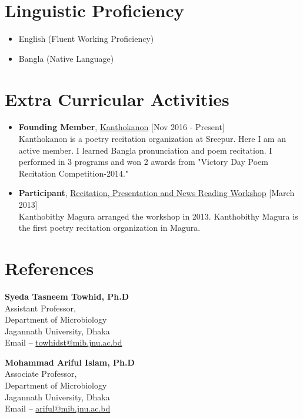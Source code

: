 \documentclass[11pt,a4paper]{moderncv}
\begin{document}
\section{Linguistic Proficiency}
\begin{itemize}  	
	\item English (Fluent Working Proficiency)
	\item Bangla (Native Language)
\end{itemize}



\section{Extra Curricular Activities}
\begin{itemize}
	\item \textbf{Founding Member}, 
	\textcolor{blue}{\href{}{Kanthokanon}}
	\hfill [Nov 2016 - Present]\\ 
	Kanthokanon is a poetry recitation organization at Sreepur. Here I am an 
	active member. I learned Bangla pronunciation and poem recitation. I 
	performed in 3 programs and won 2 awards from "Victory Day Poem Recitation 
	Competition-2014."
	
	\item \textbf{Participant}, 
	\textcolor{blue}{\href{}{Recitation, Presentation and News Reading 
	Workshop}}
	\hfill [March 2013]\\ 
	Kanthobithy Magura arranged the workshop in 2013. Kanthobithy Magura is the 
	first poetry recitation organization in Magura. 
	
	
\end{itemize}

\section{References}
\begin{multicols}{2}
\textbf{Syeda Tasneem Towhid, Ph.D}\\ 
Assistant Professor, \\ 
Department of Microbiology \\ 
Jagannath University, Dhaka \\ 
Email -- \textcolor{blue}{\url{towhidst@mib.jnu.ac.bd}} 

\columnbreak 
\textbf{Mohammad Ariful Islam, Ph.D}\\ 
Associate Professor,\\ 
Department of Microbiology \\ 
Jagannath University, Dhaka \\ 
Email -- \textcolor{blue}{\url{ariful@mib.jnu.ac.bd}}
\end{multicols} 
\end{document}

